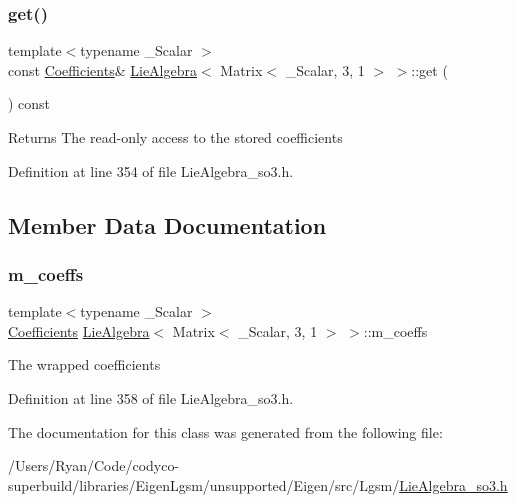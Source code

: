 \subsubsection{\texorpdfstring{get()}{get()}\hspace{0.1cm}{\footnotesize\ttfamily [2/2]}}
{\footnotesize\ttfamily template$<$typename \+\_\+\+Scalar $>$ \\
const \hyperlink{class_lie_algebra_3_01_matrix_3_01___scalar_00_013_00_011_01_4_01_4_a028504a0d794d492dc47b2edd056fe47}{Coefficients}\& \hyperlink{class_lie_algebra}{Lie\+Algebra}$<$ Matrix$<$ \+\_\+\+Scalar, 3, 1 $>$ $>$\+::get (\begin{DoxyParamCaption}{ }\end{DoxyParamCaption}) const\hspace{0.3cm}{\ttfamily [inline]}}

\begin{DoxyReturn}{Returns}
The read-\/only access to the stored coefficients 
\end{DoxyReturn}


Definition at line 354 of file Lie\+Algebra\+\_\+so3.\+h.



\subsection{Member Data Documentation}
\hypertarget{class_lie_algebra_3_01_matrix_3_01___scalar_00_013_00_011_01_4_01_4_aeb9883398abbe97d15ce250f5cb214ce}{}\label{class_lie_algebra_3_01_matrix_3_01___scalar_00_013_00_011_01_4_01_4_aeb9883398abbe97d15ce250f5cb214ce} 
\subsubsection{\texorpdfstring{m\+\_\+coeffs}{m\_coeffs}}
{\footnotesize\ttfamily template$<$typename \+\_\+\+Scalar $>$ \\
\hyperlink{class_lie_algebra_3_01_matrix_3_01___scalar_00_013_00_011_01_4_01_4_a028504a0d794d492dc47b2edd056fe47}{Coefficients} \hyperlink{class_lie_algebra}{Lie\+Algebra}$<$ Matrix$<$ \+\_\+\+Scalar, 3, 1 $>$ $>$\+::m\+\_\+coeffs\hspace{0.3cm}{\ttfamily [protected]}}

The wrapped coefficients 

Definition at line 358 of file Lie\+Algebra\+\_\+so3.\+h.



The documentation for this class was generated from the following file\+:\begin{DoxyCompactItemize}
\item 
/\+Users/\+Ryan/\+Code/codyco-\/superbuild/libraries/\+Eigen\+Lgsm/unsupported/\+Eigen/src/\+Lgsm/\hyperlink{_lie_algebra__so3_8h}{Lie\+Algebra\+\_\+so3.\+h}\end{DoxyCompactItemize}
